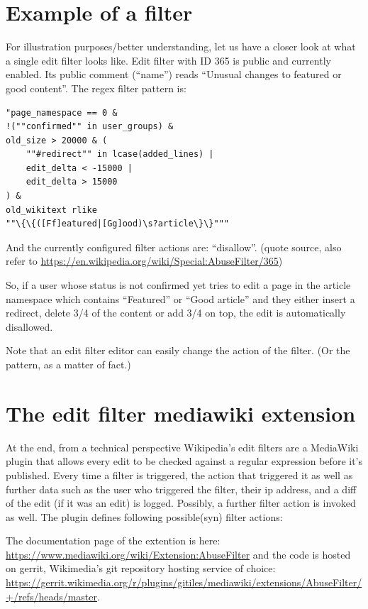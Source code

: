 \section{Example of a filter}

For illustration purposes/better understanding, let us have a closer look at what a single edit filter looks like.
Edit filter with ID 365 is public and currently enabled.
Its public comment (``name'') reads ``Unusual changes to featured or good content''.
The regex filter pattern is:
\begin{verbatim}
"page_namespace == 0 &
!(""confirmed"" in user_groups) &
old_size > 20000 & (
    ""#redirect"" in lcase(added_lines) |
    edit_delta < -15000 |
    edit_delta > 15000
) &
old_wikitext rlike
""\{\{([Ff]eatured|[Gg]ood)\s?article\}\}"""
\end{verbatim}
And the currently configured filter actions are: ``disallow''.
(quote source, also refer to \url{https://en.wikipedia.org/wiki/Special:AbuseFilter/365})

So, if a user whose status is not confirmed yet tries to edit a page in the article namespace which contains ``Featured'' or ``Good article'' and they either insert a redirect, delete 3/4 of the content or add 3/4 on top, the edit is automatically disallowed.

Note that an edit filter editor can easily change the action of the filter. (Or the pattern, as a matter of fact.)


\section{The edit filter mediawiki extension}

At the end, from a technical perspective Wikipedia's edit filters are a MediaWiki plugin that allows every edit to be checked against a regular expression before it's published.
Every time a filter is triggered, the action that triggered it as well as further data such as the user who triggered the filter, their ip address, and a diff of the edit (if it was an edit) is logged.
Possibly, a further filter action is invoked as well.
The plugin defines following possible(syn) filter actions: %

The documentation page of the extention is here: \url{https://www.mediawiki.org/wiki/Extension:AbuseFilter}
and the code is hosted on gerrit, Wikimedia's git repository hosting service of choice: \url{https://gerrit.wikimedia.org/r/plugins/gitiles/mediawiki/extensions/AbuseFilter/+/refs/heads/master}.

